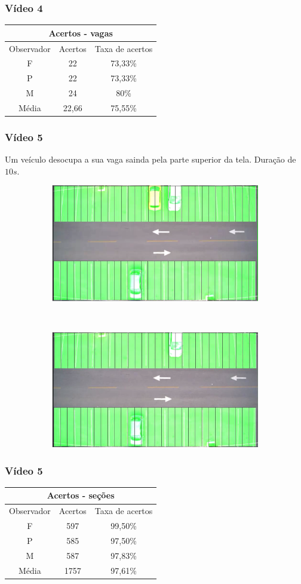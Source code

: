 \documentclass{beamer}
\begin{document}
\begin{frame}
\frametitle{Vídeo 4}
\begin{center}
\begin{tabular}{|c||c||c|}
\hline
\multicolumn{3}{|c|}{Acertos - vagas}  \\ \hline \hline
Observador & Acertos & Taxa de acertos \\ \hline
F & 22 & 73,33\% \\  \hline
P & 22 & 73,33\% \\ \hline
M & 24 & 80\% \\ \hline
Média & 22,66 & 75,55\% \\
\hline
\end{tabular}
\end{center}
\end{frame}

\begin{frame}
\frametitle{Vídeo 5}

Um veículo desocupa a sua vaga sainda pela parte superior da tela. Duração de $10s$.

\begin{figure}
\centering
\begin{subfigure}{.5\textwidth}
\centering
\includegraphics[width=.5\linewidth]{Video5Inicio}
\end{subfigure}\
\begin{subfigure}{.5\textwidth}
\centering
\includegraphics[width=.5\linewidth]{Video5Fim}
\end{subfigure}
\centering
\end{figure}	
\end{frame}

\begin{frame}
	\frametitle{Vídeo 5}
\begin{center}
\begin{tabular}{|c||c||c|}
\hline
\multicolumn{3}{|c|}{Acertos - seções}  \\ \hline
Observador & Acertos & Taxa de acertos \\ \hline
F & 597 & 99,50\% \\  \hline
P & 585 & 97,50\% \\ \hline
M & 587 & 97,83\% \\ \hline
Média & 1757 & 97,61\% \\
\hline
\end{tabular}
\end{center}
\end{frame}
\end{document}
